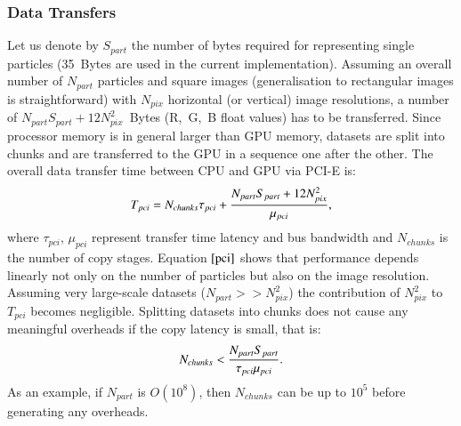 \documentclass[preprint,5pt]{elsarticle}
\begin{document}
\subsubsection{Data Transfers}
Let us denote by $S_{part}$ the number of bytes required for representing single particles (35~Bytes are used in the current implementation). Assuming an overall number of $N_{part}$ particles
and square images (generalisation to rectangular images is straightforward) with $N_{pix}$ horizontal (or vertical) image resolutions, a number of $N_{part} S_{part} + 12 N_{pix}^2$~Bytes (R,~G,~B float values) has to be transferred. 
Since processor memory is in general larger than GPU memory,
datasets are split into chunks and are transferred to the GPU in a sequence one after the other. The overall data transfer time between CPU and GPU via PCI-E is:
\begin{equation}\label{pci}
T_{pci} =  N_{chunks} \tau_{pci} + {N_{part} S_{part} + 12 N_{pix}^2 \over 
\mu_{pci}},
\end{equation}
where $\tau_{pci}$, $\mu_{pci}$ represent transfer time latency and bus bandwidth and $N_{chunks}$ is the number of copy stages. Equation $\eqref{pci}$ shows that performance depends linearly not only on the number of particles but also on the image resolution. Assuming very large-scale datasets ($N_{part} >> N_{pix}^2$) the contribution of $N_{pix}^2$ to $T_{pci}$ becomes negligible. 
Splitting datasets into chunks does not cause any meaningful overheads if the copy latency is small, that is:
\begin{equation}
N_{chunks} < {N_{part} S_{part}\over \tau_{pci}\mu_{pci}}.
\end{equation}
As an example, if $N_{part}$ is $O(10^8)$, then $N_{chunks}$ can be up to $10^5$ before
generating any overheads. 
\end{document}
